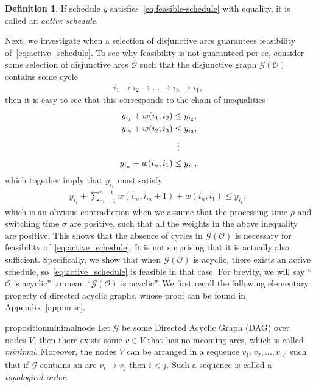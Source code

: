 \documentclass[a4paper]{report}
\theoremstyle{definition}
\newtheorem{define}{Definition}[chapter]
\theoremstyle{plain}
\begin{document}
\begin{define}\label{def:active}
  If schedule $y$ satisfies~\eqref{eq:feasible-schedule} with equality, it is called an
  \emph{active schedule}.
\end{define}
%

Next, we investigate when a selection of disjunctive arcs guarantees
feasibility of~\eqref{eq:active_schedule}.
%
To see why feasibility is not guaranteed per se, consider some selection of
disjunctive arcs $\mathcal{O}$ such that the disjunctive graph $\mathcal{G}(\mathcal{O})$
contains some cycle
\begin{align*}
 i_1 \rightarrow i_2 \rightarrow \dots \rightarrow i_n \rightarrow i_1,
\end{align*}
%
then it is easy to see that this corresponds to the chain of inequalities
\begin{align*}
  y_{i_1} + w(i_1,i_2) &\leq y_{i_2} ,\\
  y_{i_2} + w(i_2,i_3) &\leq y_{i_3} ,\\
  &\vdotswithin{=} \notag \\[0.3em]
  y_{i_n} + w(i_n,i_1) &\leq y_{i_1} ,
\end{align*}
%
which together imply that $y_{i_1}$ must satisfy
\begin{align*}
  y_{i_1} + \sum_{m=1}^{n-1} w(i_m, i_m+1) + w(i_n, i_1) \leq y_{i_1} ,
\end{align*}
which is an obvious contradiction when we assume that the processing time $\rho$
and switching time $\sigma$ are positive, such that all the weights in the above
inequality are positive.
%
This shows that the absence of cycles in $\mathcal{G}(\mathcal{O})$ is necessary
for feasibility of~\eqref{eq:active_schedule}. It is not surprising that it is actually also
sufficient.
%
Specifically, we show that when $\mathcal{G}(\mathcal{O})$ is acyclic, there exists an
active schedule, so~\eqref{eq:active_schedule} is feasible in that case.
%
For brevity, we will say ``$\mathcal{O}$ is acyclic'' to mean ``$\mathcal{G}(\mathcal{O})$
is acyclic''.
%
We first recall the following elementary property of directed acyclic graphs,
whose proof can be found in Appendix~\ref{app:misc}.

\begin{restatable}{proposition}{minimalnode}\label{lemma:minimal-node}
  Let $\mathcal{G}$ be some Directed Acyclic Graph (DAG) over nodes $V$, then
  there exists some $v \in V$ that has no incoming arcs, which is called
  \emph{minimal}. Moreover, the nodes $V$ can be arranged in a sequence
  $v_1, v_2, \dots, v_{|V|}$ such that if $\mathcal{G}$ contains an arc
  $v_i \rightarrow v_j$ then $i < j$. Such a sequence is called a
  \emph{topological order}.
\end{restatable}
\end{document}
